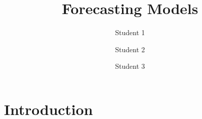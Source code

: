 \documentclass[10pt]{article}
\title{Forecasting Models}
\author{Student 1 \and Student 2 \and Student 3}
\begin{document}
\maketitle

\section{Introduction}








\end{document}
